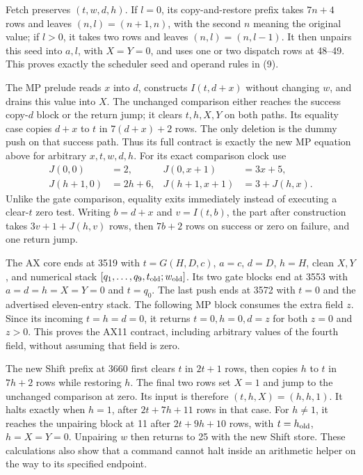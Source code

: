 Fetch preserves $(t,w,d,h)$.  If $l=0$, its copy-and-restore prefix
takes $7n+4$ rows and leaves $(n,l)=(n+1,n)$, with the second $n$
meaning the original value; if $l>0$, it takes two rows and leaves
$(n,l)=(n,l-1)$.  It then unpairs this seed into $a,l$, with
$X=Y=0$, and uses one or two dispatch rows at 48--49.  This proves
exactly the scheduler seed and operand rules in (9).

The MP prelude reads $x$ into $d$, constructs $I(t,d+x)$ without
changing $w$, and drains this value into $X$.  The unchanged
comparison either reaches the success copy-$d$ block or the return
jump; it clears $t,h,X,Y$ on both paths.  Its equality case copies
$d+x$ to $t$ in $7(d+x)+2$ rows.  The only deletion is the dummy
push on that success path.  Thus its full contract is exactly the
new MP equation above for arbitrary $x,t,w,d,h$.
For its exact comparison clock use
\begin{align*}
 J(0,0)&=2,&J(0,x+1)&=3x+5,\\
 J(h+1,0)&=2h+6,&J(h+1,x+1)&=3+J(h,x).
\end{align*}
Unlike the gate comparison, equality exits immediately instead of
executing a clear-$t$ zero test.  Writing $b=d+x$ and $v=I(t,b)$,
the part after construction takes $3v+1+J(h,v)$ rows, then
$7b+2$ rows on success or zero on failure, and one return jump.

The AX core ends at 3519 with $t=G(H,D,c)$, $a=c$, $d=D$,
$h=H$, clean $X,Y$, and numerical stack
$[q_1,\ldots,q_9,t_{\rm old};w_{\rm old}]$.  Its two gate blocks
end at 3553 with $a=d=h=X=Y=0$ and $t=q_0$.  The last push
ends at 3572 with $t=0$ and the advertised eleven-entry stack.
The following MP block consumes the extra field $z$.  Since its
incoming $t=h=d=0$, it returns $t=0,h=0,d=z$ for both $z=0$
and $z>0$.  This proves the AX11 contract, including arbitrary
values of the fourth field, without assuming that field is zero.

The new Shift prefix at 3660 first clears $t$ in $2t+1$ rows,
then copies $h$ to $t$ in $7h+2$ rows while restoring $h$.
The final two rows set $X=1$ and jump to the unchanged comparison
at zero.  Its input is therefore $(t,h,X)=(h,h,1)$.  It halts
exactly when $h=1$, after $2t+7h+11$ rows in that case.
For $h\ne1$, it reaches the unpairing block at 11 after
$2t+9h+10$ rows, with $t=h_{\rm old}$, $h=X=Y=0$.
Unpairing $w$ then returns to 25 with the new Shift store.
These calculations also show that a command cannot halt inside
an arithmetic helper on the way to its specified endpoint.

